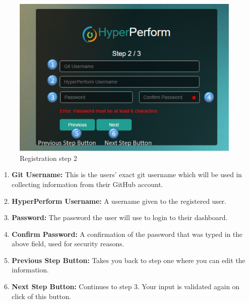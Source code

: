\documentclass[11pt,a4paper]{article}
\begin{document}
\begin{figure}[H]
	\begin{center}
		\includegraphics[scale=0.35]{../Images/Getting_Started/Step_2_numbered}
		\caption{Registration step 2}
	\end{center}
\end{figure}
\begin{enumerate}
	\item \textbf{Git Username:} This is the users' exact git username which will be used in collecting information from their GitHub account. 
	\item \textbf{HyperPerform Username:} A username given to the registered user.
	\item \textbf{Password:} The password the user will use to login to their dashboard.
	\item \textbf{Confirm Password:} A confirmation of the password that was typed in the above field, used for security reasons. 
	\item \textbf{Previous Step Button:} Takes you back to step one where you can edit the information. 
	\item \textbf{Next Step Button:} Continues to step 3. Your input is validated again on click of this button. 
\end{enumerate}
\end{document}
